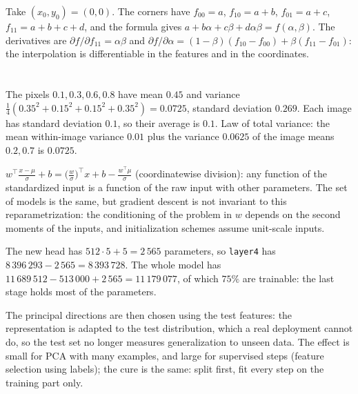 Take $(x_0,y_0) = (0,0)$. The corners have $f_{00} = a$, $f_{10} = a + b$, $f_{01} = a + c$, $f_{11} = a + b + c + d$, and the formula gives
$a + b\alpha + c\beta + d\alpha\beta = f(\alpha,\beta)$. The derivatives are $\partial f/\partial f_{11} = \alpha\beta$ and
$\partial f/\partial\alpha = (1 - \beta)(f_{10} - f_{00}) + \beta(f_{11} - f_{01})$: the interpolation is differentiable in the features and in the
coordinates.

\section{}

The pixels $0.1, 0.3, 0.6, 0.8$ have mean $0.45$ and variance $\frac14(0.35^2 + 0.15^2 + 0.15^2 + 0.35^2) = 0.0725$, standard deviation
$0.269$. Each image has standard deviation $0.1$, so their average is $0.1$. Law of total variance: the
mean within-image variance $0.01$ plus the variance $0.0625$ of the image means $0.2, 0.7$ is $0.0725$.

$w^\top\frac{x - \mu}\sigma + b = \bigl(\frac w\sigma\bigr)^\top x + b - \frac{w^\top\mu}\sigma$ (coordinatewise division): any function of the standardized input is a
function of the raw input with other parameters. The set of models is the same, but
gradient descent is not invariant to this reparametrization: the conditioning of the
problem in $w$ depends on the second moments of the inputs, and initialization schemes
assume unit-scale inputs.

The new head has $512\cdot5 + 5 = 2\,565$ parameters, so \texttt{layer4} has $8\,396\,293 - 2\,565 = 8\,393\,728$. The whole model has
$11\,689\,512 - 513\,000 + 2\,565 = 11\,179\,077$, of which $75\%$ are trainable: the last stage holds most of the parameters.

The principal directions are then chosen using the test features: the representation is
adapted to the test distribution, which a real deployment cannot do, so the test set no
longer measures generalization to unseen data. The effect is small for PCA with many
examples, and large for supervised steps (feature selection using labels); the cure is
the same: split first, fit every step on the training part only.

\section{}

